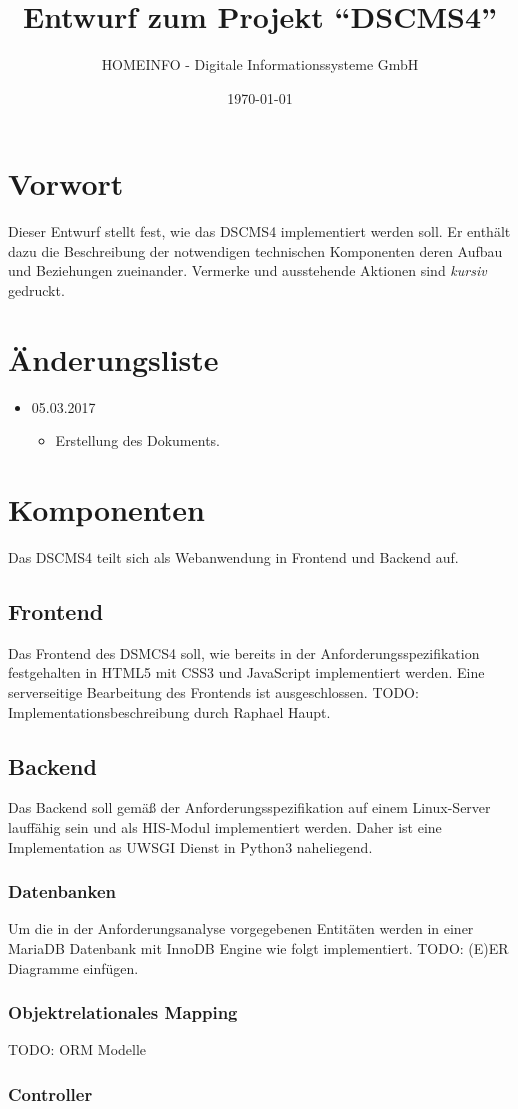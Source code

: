 \documentclass[a4paper]{article}
\title{Entwurf zum Projekt \linebreak \enquote{DSCMS4}}
\author{HOMEINFO - Digitale Informationssysteme GmbH}
\date{\today}
\begin{document}
	
	\maketitle
	\pagebreak
	
	\tableofcontents
	\pagebreak
	
	\section*{Vorwort}
	Dieser Entwurf stellt fest, wie das DSCMS4 implementiert werden soll. Er enthält dazu die Beschreibung der notwendigen technischen Komponenten deren Aufbau und Beziehungen zueinander.
	Vermerke und ausstehende Aktionen sind \emph{kursiv} gedruckt.
	\section*{Änderungsliste}
	\begin{itemize}
		\item 05.03.2017
		\begin{itemize}
			\item Erstellung des Dokuments.
		\end{itemize}
	\end{itemize}
	
	\pagebreak
	\section{Komponenten}
	Das DSCMS4 teilt sich als Webanwendung in Frontend und Backend auf.
	\subsection{Frontend}
	Das Frontend des DSMCS4 soll, wie bereits in der Anforderungsspezifikation festgehalten in HTML5 mit CSS3 und JavaScript implementiert werden.
	Eine serverseitige Bearbeitung des Frontends ist ausgeschlossen.
	TODO: Implementationsbeschreibung durch Raphael Haupt.
	\subsection{Backend}
	Das Backend soll gemäß der Anforderungsspezifikation auf einem Linux-Server lauffähig sein und als HIS-Modul implementiert werden.
	Daher ist eine Implementation as UWSGI Dienst in Python3 naheliegend.
	\subsubsection{Datenbanken}
	Um die in der Anforderungsanalyse vorgegebenen Entitäten werden in einer MariaDB Datenbank mit InnoDB Engine wie folgt implementiert.
	TODO: (E)ER Diagramme einfügen.
	\subsubsection{Objektrelationales Mapping}
	TODO: ORM Modelle
	\subsubsection{Controller}
\end{document}
